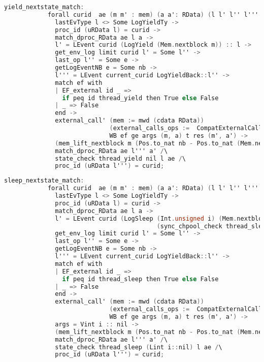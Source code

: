 \begin{lstlisting}[language=C]
          yield_nextstate_match:
            forall curid  ae (m m' : mem) (a a': RData) (l l' l'' l''': Log) e nb WB ef (ge : genv) args m t res,
              lastEvType l <> Some LogYieldTy ->
              proc_id (uRData l) = curid ->
              match_dproc_RData ae l a ->
              l' = LEvent curid (LogYield (Mem.nextblock m)) :: l ->
              get_env_log limit curid l' = Some l'' ->
              last_op l'' = Some e ->
              getLogEventNB e = Some nb -> 
              l''' = LEvent current_curid LogYieldBack::l'' ->
              match ef with 
              | EF_external id _ =>
                if peq id thread_yield then True else False 
              | _ => False
              end ->
              external_call' (mem := mwd (cdata RData)) 
                             (external_calls_ops :=  CompatExternalCalls.compatlayer_extcall_ops (phthread <@$\oplus$@>  L64))
                             WB ef ge args (m, a) t res (m', a') ->
              (mem_lift_nextblock m (Pos.to_nat nb - Pos.to_nat (Mem.nextblock m)) = m') /\
              match_dproc_RData ae l''' a' /\
              state_check thread_yield nil l ae /\
              proc_id (uRData l''') = curid;
\end{lstlisting}

\begin{lstlisting}[language=C]
          sleep_nextstate_match:
            forall curid  ae (m m' : mem) (a a': RData) (l l' l'' l''': Log) e nb WB ef (ge : genv) args m t res i,
              lastEvType l <> Some LogYieldTy ->
              proc_id (uRData l) = curid ->
              match_dproc_RData ae l a ->
              l' = LEvent curid (LogSleep (Int.unsigned i) (Mem.nextblock m)
                                          (sync_chpool_check thread_sleep (Lint i::nil) (uRData l) ae))::l ->
              get_env_log limit curid l' = Some l'' ->
              last_op l'' = Some e ->
              getLogEventNB e = Some nb -> 
              l''' = LEvent current_curid LogYieldBack::l'' ->
              match ef with 
              | EF_external id _ =>
                if peq id thread_sleep then True else False 
              | _ => False
              end ->
              external_call' (mem := mwd (cdata RData)) 
                             (external_calls_ops :=  CompatExternalCalls.compatlayer_extcall_ops (phthread <@$\oplus$@>  L64))
                             WB ef ge args (m, a) t res (m', a') ->
              args = Vint i :: nil ->
              (mem_lift_nextblock m (Pos.to_nat nb - Pos.to_nat (Mem.nextblock m)) = m') /\
              match_dproc_RData ae l''' a' /\
              state_check thread_sleep (Lint i::nil) l ae /\
              proc_id (uRData l''') = curid;
\end{lstlisting}

